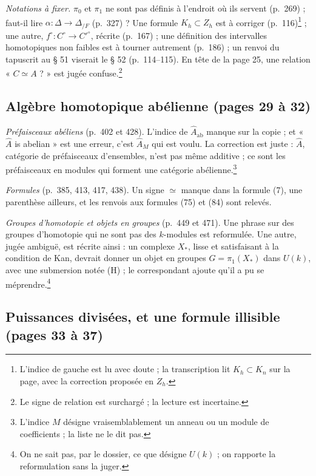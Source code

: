 \documentclass[11pt,a4paper]{article}
\begin{document}
\emph{Notations à fixer.} $\pi_{0}$ et $\pi_{1}$ ne sont pas définis à
l'endroit où ils servent (p.\ 269) ; faut-il lire $\alpha : \Delta \to
\Delta_{/F}$ (p.\ 327) ? Une formule $K_{h} \subset Z_{h}$ est à corriger
(p.\ 116)\footnote{L'indice de gauche est lu avec doute ; la transcription
lit $K_{h} \subset K_{n}$ sur la page, avec la correction proposée en $Z_{h}$.} ;
une autre, $f^{\circ} : C^{\circ} \to C'^{\circ}$, récrite (p.\ 167) ; une
définition des intervalles homotopiques non faibles est à tourner autrement
(p.\ 186) ; un renvoi du tapuscrit au § 51 viserait le § 52 (p.\ 114--115).
En tête de la page 25, une relation « $C \simeq A$ ? » est jugée
confuse.\footnote{Le signe de relation est surchargé ; la lecture est
incertaine.}

\subsection*{Algèbre homotopique abélienne (pages 29 à 32)}

\emph{Préfaisceaux abéliens} (p.\ 402 et 428). L'indice de
$\widehat{A}_{\mathrm{ab}}$ manque sur la copie ; et « $\widehat{A}$ is
abelian » est une erreur, c'est $\widehat{A}_{M}$ qui est voulu. La
correction est juste : $\widehat{A}$, catégorie de préfaisceaux d'ensembles,
n'est pas même additive ; ce sont les préfaisceaux en modules qui forment une
catégorie abélienne.\footnote{L'indice $M$ désigne vraisemblablement un
anneau ou un module de coefficients ; la liste ne le dit pas.}

\emph{Formules} (p.\ 385, 413, 417, 438). Un signe $\simeq$ manque dans la
formule (7), une parenthèse ailleurs, et les renvois aux formules (75) et
(84) sont relevés.

\emph{Groupes d'homotopie et objets en groupes} (p.\ 449 et 471). Une phrase
sur des groupes d'homotopie qui ne sont pas des $k$-modules est reformulée.
Une autre, jugée ambiguë, est récrite ainsi : un complexe $X_{*}$, lisse et
satisfaisant à la condition de Kan, devrait donner un objet en groupes
$G = \pi_{1}(X_{*})$ dans $U(k)$, avec une submersion notée (H) ; le
correspondant ajoute qu'il a pu se méprendre.\footnote{On ne sait pas, par
le dossier, ce que désigne $U(k)$ ; on rapporte la reformulation sans la
juger.}

\subsection*{Puissances divisées, et une formule illisible (pages 33 à 37)}
\end{document}

